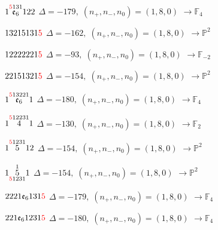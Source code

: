 \documentclass[10pt]{article}
\begin{document}
$1\overset{\textcolor{red}{5}131}{\mathfrak{e}_6}122$ \quad $\Delta=-179,\; (n_+,n_-,n_0)=(1,8,0)$ \quad $\to \mathbb{F}_{4}$

\smallskip

$13215131\textcolor{red}{5}$ \quad $\Delta=-162,\; (n_+,n_-,n_0)=(1,8,0)$ \quad $\to \mathbb{P}^2$

\smallskip

$12222221\textcolor{red}{5}$ \quad $\Delta=-93,\; (n_+,n_-,n_0)=(1,8,0)$ \quad $\to \mathbb{F}_{-2}$

\smallskip

$22151321\textcolor{red}{5}$ \quad $\Delta=-154,\; (n_+,n_-,n_0)=(1,8,0)$ \quad $\to \mathbb{P}^2$

\smallskip

$1\overset{\textcolor{red}{5}13221}{\mathfrak{e}_6}1$ \quad $\Delta=-180,\; (n_+,n_-,n_0)=(1,8,0)$ \quad $\to \mathbb{F}_{4}$

\smallskip

$1\overset{\textcolor{red}{5}12231}{4}1$ \quad $\Delta=-130,\; (n_+,n_-,n_0)=(1,8,0)$ \quad $\to \mathbb{F}_{2}$

\smallskip

$1\overset{\textcolor{red}{5}1231}{5}12$ \quad $\Delta=-154,\; (n_+,n_-,n_0)=(1,8,0)$ \quad $\to \mathbb{P}^2$

\smallskip

$1\overset{1}{\underset{\textcolor{red}{5}1231}{5}}1$ \quad $\Delta=-154,\; (n_+,n_-,n_0)=(1,8,0)$ \quad $\to \mathbb{P}^2$

\smallskip

$2221\mathfrak{e}_6131\textcolor{red}{5}$ \quad $\Delta=-179,\; (n_+,n_-,n_0)=(1,8,0)$ \quad $\to \mathbb{F}_{4}$

\smallskip

$221\mathfrak{e}_61231\textcolor{red}{5}$ \quad $\Delta=-180,\; (n_+,n_-,n_0)=(1,8,0)$ \quad $\to \mathbb{F}_{4}$

\smallskip
\end{document}
